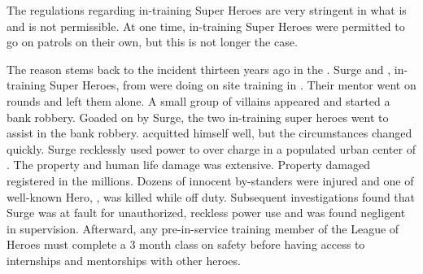 \documentclass[blue]{LRSguildcamp1}
\begin{document}
\name{\bChicagoIncident{}}

The regulations regarding in-training Super Heroes are very stringent in what is and is not permissible. At one time, in-training Super Heroes were permitted to go on patrols on their own, but this is not longer the case. 

The reason stems back to the incident thirteen years ago in the \pCityO{}. Surge and \cJuggernaut{}, in-training Super Heroes, from \pSuperSchool{} were doing on site training in \pCityO{}. Their mentor \cOS{\MYsupername} went on rounds and left them alone. A small group of villains appeared and started a bank robbery. Goaded on by Surge, the two in-training super heroes went to assist in the bank robbery. \cJuggernaut{} acquitted himself well, but the circumstances changed quickly. Surge recklessly used \cYS{\their} power to over charge \cJuggernaut{} in a populated urban center of \pCityO{}. The property and human life damage was extensive. Property damaged registered in the millions. Dozens of innocent by-standers were injured and one of well-known Hero, \cAS{}, was killed while off duty. Subsequent investigations found that Surge was at fault for unauthorized, reckless power use and \cOS{\MYsupername} was found negligent in supervision. 
Afterward, any pre-in-service training member of the League of Heroes must complete a 3 month class on safety before having access to internships and mentorships with other heroes. 


\end{document}
